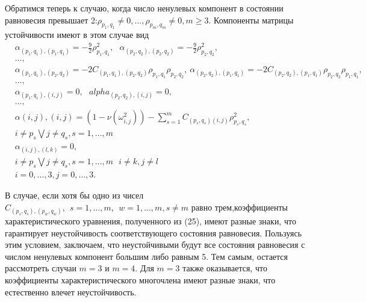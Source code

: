 \documentclass[12pt]{article}  %
\begin{document}
Обратимся теперь к случаю,  когда число ненулевых компонент в состоянии равновесия превышает 2:$\rho_{p_1,q_1}\not=0,\dots,\rho_{p_m,q_m}\not=0, m\geq3$. Компоненты матрицы устойчивости имеют в этом случае вид
\begin{equation}
\begin{split}
&\alpha_{(p_1,q_1),(p_1,q_1)}=-\frac{9}{2}\rho^2_{p_1,q_1}, \ \ \ \alpha_{(p_2,q_2),(p_2,q_2)}=-\frac{9}{2}\rho^2_{p_2,q_2}, \\
&\dots,\\
&\alpha_{(p_1,q_1),(p_2,q_2)}=-2C_{(p_1,q_1),(p_2,q_2)}\rho_{p_1,q_1}\rho_{p_2,q_2}, \  \alpha_{(p_2,q_2),(p_1,q_1)}=-2C_{(p_2,q_2),(p_1,q_1)}\rho_{p_2,q_2}\rho_{p_1,q_1}, \\
&\dots,\\
&\alpha_{(p_1,q_1),(i,j)} = 0,\ \ \ alpha_{(p_2,q_2),(i,j)} = 0,\\
&\dots,\\
&\alpha{(i,j),(i,j)}=(1-\nu(\omega^2_{i,j}))-\sum_{s=1}^{m}C_{(p_s,q_s)(i,j)}\rho^2_{p_s,q_s},\\
&i\not=p_s \bigvee j\not=q_s, s=1,\dots,m\\
&\alpha_{(i,j),(l,k)} = 0, \\
&i\not=p_s \bigvee j\not=q_s, s=1,\dots,m \ \ \ i\not=k,j\not=l\\
&i=0,\dots,3,j=0,\dots,3.
\end{split}
\end{equation}

В случае, если хотя бы одно из чисел $C_{(p_s,q_s),(p_w,q_w)}, \ \ s=1,\dots,m, \ \ w=1,\dots,m, s\not=m$ равно трем,коэффициенты характеристического уравнения, полученного из (25), имеют разные знаки, что гарантирует неустойчивость соответствующего состояния равновесия. Пользуясь этим условием, заключаем, что неустойчивыми будут все состояния равновесия с числом ненулевых компонент большим либо равным 5. Тем самым, остается рассмотреть случаи $m=3$ и $m=4$. Для $m=3$ также оказывается, что коэффициенты характеристического многочлена имеют разные знаки, что естественно влечет неустойчивость.
	
\end{document}
